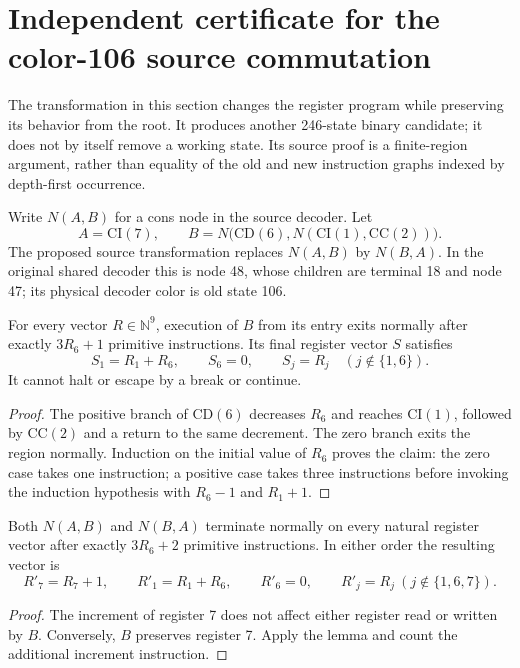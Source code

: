 \section{Independent certificate for the color-106 source commutation}
\label{sec:commute106-independent}

The transformation in this section changes the register program while
preserving its behavior from the root.  It produces another 246-state
binary candidate; it does not by itself remove a working state.
Its source proof is a finite-region argument, rather than equality of
the old and new instruction graphs indexed by depth-first occurrence.

Write $N(A,B)$ for a cons node in the source decoder.  Let
\[
 A=\mathrm{CI}(7),\qquad
 B=N\bigl(\mathrm{CD}(6),N(\mathrm{CI}(1),\mathrm{CC}(2))\bigr).
\]
The proposed source transformation replaces $N(A,B)$ by $N(B,A)$.
In the original shared decoder this is node 48, whose children are
terminal 18 and node 47; its physical decoder color is old state 106.

\begin{lemma}
For every vector $R\in\mathbb N^9$, execution of $B$ from its entry
exits normally after exactly $3R_6+1$ primitive instructions.  Its final
register vector $S$ satisfies
\[
 S_1=R_1+R_6,\qquad S_6=0,\qquad
 S_j=R_j\quad(j\notin\{1,6\}).
\]
It cannot halt or escape by a break or continue.
\end{lemma}
\begin{proof}
The positive branch of $\mathrm{CD}(6)$ decreases $R_6$ and reaches
$\mathrm{CI}(1)$, followed by $\mathrm{CC}(2)$ and a return to the
same decrement.  The zero branch exits the region normally.  Induction
on the initial value of $R_6$ proves the claim: the zero case takes one
instruction; a positive case takes three instructions before invoking
the induction hypothesis with $R_6-1$ and $R_1+1$.
\end{proof}

\begin{corollary}
Both $N(A,B)$ and $N(B,A)$ terminate normally on every natural register
vector after exactly $3R_6+2$ primitive instructions.  In either order
the resulting vector is
\[
 R'_7=R_7+1,\qquad R'_1=R_1+R_6,\qquad R'_6=0,
 \qquad R'_j=R_j\ (j\notin\{1,6,7\}).
\]
\end{corollary}
\begin{proof}
The increment of register 7 does not affect either register read or
written by $B$.  Conversely, $B$ preserves register 7.  Apply the lemma
and count the additional increment instruction.
\end{proof}

